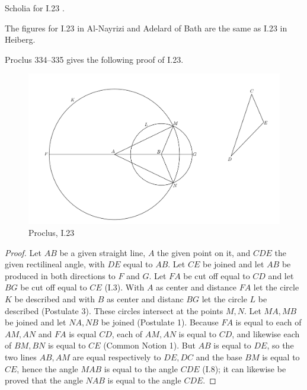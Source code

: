\documentclass{article}
\begin{document}
Scholia for I.23 \cite[pp.~161--162]{euclidisV}.

The figures for I.23 in
Al-Nayrizi \cite[pp.~146--147]{alnayriziI} 
and Adelard of Bath \cite[pp.~49--50]{adelardI} are the same as I.23 in Heiberg.

Proclus 334--335 \cite[pp.~261--262]{proclus} gives the following proof of I.23.

\begin{figure}
\begin{center}
\includegraphics[width=\textwidth]{proclusI23.png}
\end{center}
\caption{Proclus, I.23}
\label{proclusI23}
\end{figure}

\begin{proof}
Let $AB$ be a given straight line, $A$ the given point on it, and $CDE$ the given rectilineal angle, with
$DE$ equal to $AB$.
Let $CE$ be joined and let $AB$ be produced in both directions to $F$ and $G$. Let
$FA$ be cut off equal to $CD$ and let $BG$ be cut off equal to $CE$ (I.3).
With $A$ as center and distance $FA$ let the circle $K$ be described and
with $B$ as center and distanc $BG$ let the circle $L$ be described (Postulate 3).
These circles intersect at the points $M,N$.
Let $MA,MB$ be joined and let $NA,NB$ be joined (Postulate 1).
Because $FA$ is equal to each of $AM,AN$ and $FA$ is equal $CD$, each of $AM,AN$ is equal to $CD$, and likewise
each of $BM,BN$ is equal to $CE$ (Common Notion 1).
But $AB$ is equal to $DE$, so the two lines $AB,AM$ are equal respectively to $DE,DC$ and the base
$BM$ is equal to $CE$, hence the angle
$MAB$ is equal to the angle $CDE$ (I.8); it can likewise be proved that the angle
$NAB$ is equal to the angle $CDE$.
\end{proof}
\end{document}
